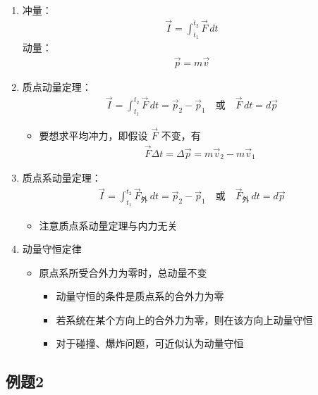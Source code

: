 \begin{enumerate}
	\item 冲量：
	\begin{align*}
		\vec{I}=\int_{t_1}^{t_2}\vec{F}\,dt
	\end{align*}
	动量：
	\begin{align*}
		\vec{p}=m\vec{v}
	\end{align*}
	
	\item 质点动量定理：
	\begin{align*}
		\vec{I}=\int_{t_1}^{t_2}\vec{F}\,dt=\vec{p}_2-\vec{p}_1
		\quad \text{或} \quad
		\vec{F}\,dt=d\vec{p}
	\end{align*}
	
	\begin{itemize}
		\item 要想求平均冲力，即假设 $\vec{F}$ 不变，有
		\begin{align*}
			\vec{F}\Delta t=\Delta \vec{p}=m\vec{v}_2-m\vec{v}_1
		\end{align*}
	\end{itemize}
	
	\item 质点系动量定理：
	\begin{align*}
		\vec{I}=\int_{t_1}^{t_2}\vec{F}_{\text{外}}\,dt=\vec{p}_2-\vec{p}_1
		\quad \text{或} \quad
		\vec{F}_{\text{外}}\,dt=d\vec{p}
	\end{align*}
	
	\begin{itemize}
		\item 注意质点系动量定理与内力无关
	\end{itemize}
	
	\item 动量守恒定律
	
	\begin{itemize}
		\item 原点系所受合外力为零时，总动量不变
		\begin{itemize}
			\item 动量守恒的条件是质点系的合外力为零
			\item 若系统在某个方向上的合外力为零，则在该方向上动量守恒
			\item 对于碰撞、爆炸问题，可近似认为动量守恒
		\end{itemize}
	\end{itemize}
	
	
\end{enumerate}

\newpage
\subsection{例题2}

